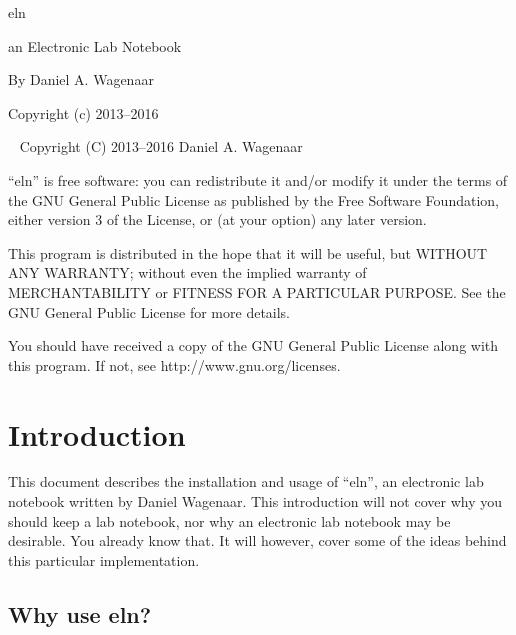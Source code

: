 \documentclass[11pt]{report}
\begin{document}
\thispagestyle{empty}
\begin{centering}
  {\Huge eln}
  \vskip30pt

  {\Large an Electronic Lab Notebook}
  \vskip60pt

  {\large By Daniel A. Wagenaar}
  \vfill
  
  {Copyright (c) 2013--2016}
  
\end{centering}
\pagebreak
~
\vfill
\noindent Copyright (C) 2013--2016 Daniel A. Wagenaar\medskip

``eln'' is free software: you can redistribute it and/or modify
it under the terms of the GNU General Public License as published by
the Free Software Foundation, either version 3 of the License, or
(at your option) any later version.

This program is distributed in the hope that it will be useful,
but WITHOUT ANY WARRANTY; without even the implied warranty of
MERCHANTABILITY or FITNESS FOR A PARTICULAR PURPOSE.  See the
GNU General Public License for more details.

You should have received a copy of the GNU General Public License
along with this program.  If not, see http://www.gnu.org/licenses.
\pagebreak

\chapter{Introduction}

This document describes the installation and usage of ``eln'', an
electronic lab notebook written by Daniel Wagenaar.  This introduction
will not cover why you should keep a lab notebook, nor why an
electronic lab notebook may be desirable. You already know that.  It
will however, cover some of the ideas behind this particular
implementation.

\section{Why use eln?}
\end{document}

